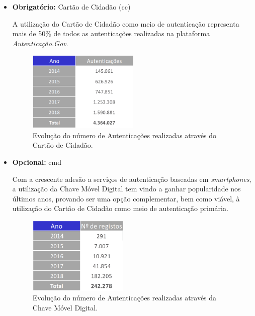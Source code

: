 \begin{itemize}
    \item \textbf{Obrigatório: } Cartão de Cidadão (\gls{cc})
    
    A utilização do Cartão de Cidadão como meio de autenticação representa mais de 50\% de todos as autenticações realizadas na plataforma \emph{Autenticação.Gov}.
    
    \begin{figure}[h]
        \centering
        \includegraphics[width=0.5\textwidth]{img/authgov/authCC.png}
        \caption{Evolução do número de Autenticações realizadas através do Cartão de Cidadão.\cite{authGovStats}}
    \end{figure}
    
    \cleardoublepage
    \item \textbf{Opcional: }\gls{cmd}
    
    Com a crescente adesão a serviços de autenticação baseadas em \emph{smartphones}, a utilização da Chave Móvel Digital tem vindo a ganhar popularidade nos últimos anos, provando ser uma opção complementar, bem como viável, à utilização do Cartão de Cidadão como meio de autenticação primária.
    
    \begin{figure}[h]
        \centering
        \includegraphics[width=0.45\textwidth]{img/authgov/authCMD.png}
        \caption{Evolução do número de Autenticações realizadas através da Chave Móvel Digital.\cite{authGovStats}}
    \end{figure}
\end{itemize}

